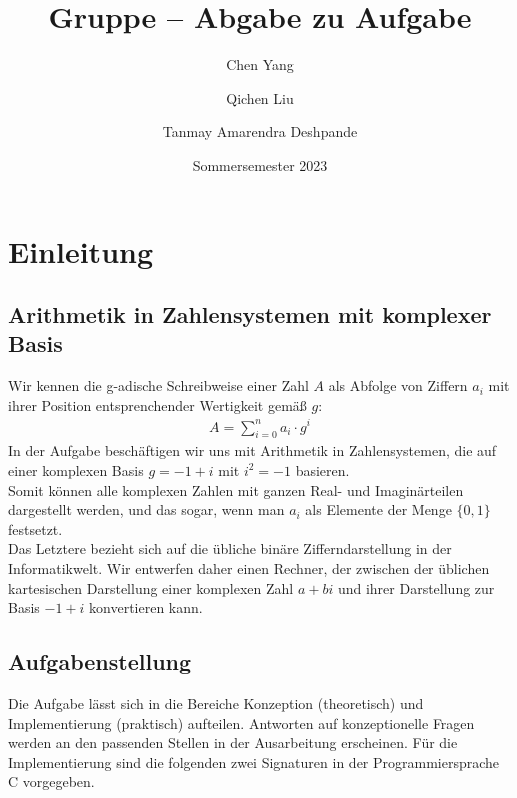 \documentclass[course=erap]{aspdoc}
\author{Chen Yang \and Qichen Liu \and Tanmay Amarendra Deshpande}
\date{Sommersemester 2023} %
\title{Gruppe \theGroup{} -- Abgabe zu Aufgabe \theNumber}
\begin{document}
\maketitle

\section{Einleitung}
\subsection{Arithmetik in Zahlensystemen mit komplexer Basis}
Wir kennen die g-adische Schreibweise einer Zahl $A$ als Abfolge von Ziffern $a_i$ mit ihrer Position entsprenchender Wertigkeit gemäß $g$:
\begin{eqnarray}
A = \sum_{i = 0}^{n} a_i \cdot g^i \nonumber
\end{eqnarray}
In der Aufgabe beschäftigen wir uns mit Arithmetik in Zahlensystemen, die auf einer komplexen Basis $g = -1 + i$ mit $i^2 = -1$ basieren.\\
Somit\cite{Penney1965AS} können alle komplexen Zahlen mit ganzen Real- und Imaginärteilen dargestellt werden, und das sogar, wenn man $a_i$ als Elemente der Menge $\{0, 1\}$ festsetzt. \\
Das Letztere bezieht sich auf die übliche binäre Zifferndarstellung in der Informatikwelt. Wir entwerfen daher einen Rechner, der zwischen der üblichen kartesischen Darstellung einer komplexen Zahl $a + bi$ und ihrer Darstellung zur Basis $-1 + i$ konvertieren kann.

\subsection{Aufgabenstellung}
Die Aufgabe lässt sich in die Bereiche Konzeption (theoretisch) und Implementierung (praktisch) aufteilen. Antworten auf konzeptionelle Fragen werden an den passenden Stellen in der Ausarbeitung erscheinen. Für die Implementierung sind die folgenden zwei Signaturen in der Programmiersprache C vorgegeben.


\end{document}
